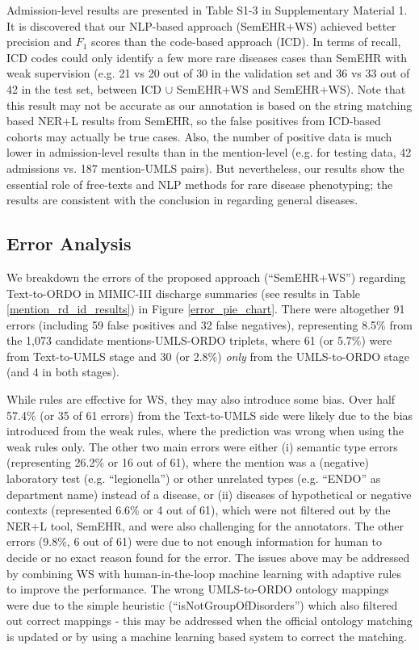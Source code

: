 \documentclass[twocolumn]{bmcart}
\begin{document}
Admission-level results are presented in Table S1-3 in Supplementary Material 1. It is discovered that our NLP-based approach (SemEHR+WS) achieved better precision and $F_1$ scores than the code-based approach (ICD). In terms of recall, ICD codes could only identify a few more rare diseases cases than SemEHR with weak supervision (e.g. 21 vs 20 out of 30 in the validation set and 36 vs 33 out of 42 in the test set, between ICD $\cup$ SemEHR+WS and SemEHR+WS). Note that this result may not be accurate as our annotation is based on the string matching based NER+L results from SemEHR, so the false positives from ICD-based cohorts may actually be true cases. Also, the number of positive data is much lower in admission-level results than in the mention-level (e.g. for testing data, 42 admissions vs. 187 mention-UMLS pairs). But nevertheless, our results show the essential role of free-texts and NLP methods for rare disease phenotyping; the results are consistent with the conclusion in \cite{Ford2016} regarding general diseases.

\subsection*{Error Analysis}
\label{subsec:error_analysis}
We breakdown the errors of the proposed approach (``SemEHR+WS'') regarding Text-to-ORDO in MIMIC-III discharge summaries (see results in Table \ref{mention_rd_id_results}) in Figure \ref{error_pie_chart}. There were altogether 91 errors (including 59 false positives and 32 false negatives), representing 8.5\% from the 1,073 candidate mentions-UMLS-ORDO triplets, where 61 (or 5.7\%) were from Text-to-UMLS stage and 30 (or 2.8\%) \emph{only} from the UMLS-to-ORDO stage (and 4 in both stages).

While rules are effective for WS, they may also introduce some bias. Over half 57.4\% (or 35 of 61 errors) from the Text-to-UMLS side were likely due to the bias introduced from the weak rules, where the prediction was wrong when using the weak rules only. The other two main errors were either (i) semantic type errors (representing 26.2\% or 16 out of 61), where the mention was a (negative) laboratory test (e.g. ``legionella'') or other unrelated types (e.g. ``ENDO'' as department name) instead of a disease, or (ii) diseases of hypothetical or negative contexts (represented 6.6\% or 4 out of 61), which were not filtered out by the NER+L tool, SemEHR, and were also challenging for the annotators. The other errors (9.8\%, 6 out of 61) were due to not enough information for human to decide or no exact reason found for the error. The issues above may be addressed by combining WS with human-in-the-loop machine learning \cite{monarch2021} with adaptive rules to improve the performance. The wrong UMLS-to-ORDO ontology mappings were due to the simple heuristic (``isNotGroupOfDisorders'') which also filtered out correct mappings - this may be addressed when the official ontology matching is updated or by using a machine learning based system to correct the matching.
\end{document}
